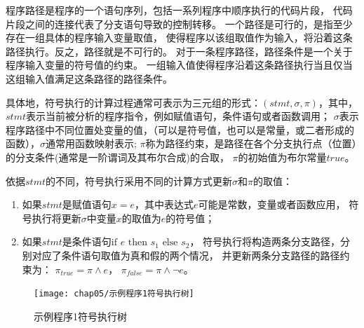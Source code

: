 程序路径是程序的一个语句序列，包括一系列程序中顺序执行的代码片段，
代码片段之间的连接代表了分支语句导致的控制转移。
一个路径是可行的，是指至少存在一组具体的程序输入变量取值，
使得程序以该组取值作为输入，将沿着这条路径执行。反之，路径就是不可行的。
对于一条程序路径，路径条件是一个关于程序输入变量的符号值的约束。
一组输入值使得程序沿着这条路径执行当且仅当这组输入值满足这条路径的路径条件。

具体地，符号执行的计算过程通常可表示为三元组的形式：$(stmt, \sigma, \pi)$，其中，
$stmt$表示当前被分析的程序指令，例如赋值语句，条件语句或者函数调用；
$\sigma$表示程序路径中不同位置处变量的值，（可以是符号值，也可以是常量，或二者形成的函数），$\sigma$通常用函数映射表示;
$\pi$称为路径约束，是路径在各个分支执行点（位置）的分支条件(通常是一阶谓词及其布尔合成)的合取，
$\pi$的初始值为布尔常量$true$。

依据$stmt$的不同，符号执行采用不同的计算方式更新$\sigma$和$\pi$的取值：
\begin{enumerate}
\item 如果$stmt$是赋值语句$x = e$，其中表达式$e$可能是常数，变量或者函数应用，
	符号执行将更新$\sigma$中变量$x$的取值为$e$的符号值；
\item 如果$stmt$是条件语句$\text{if } e \text{ then } s_1 \text{ else } s_2$，
	符号执行将构造两条分支路径，分别对应了条件语句取值为真和假的两个情况，
	并更新两条分支路径的路径约束为： $\pi_{true} = \pi \wedge e$， 
	$\pi_{false} = \pi \wedge  \neg e$。
\end{enumerate}

\begin{figure}[htb]
\begin{center}
\texttt{[image: chap05/示例程序1符号执行树]}
\end{center}
\caption{示例程序1符号执行树}
\label{exam1-se-tree}
\end{figure}

